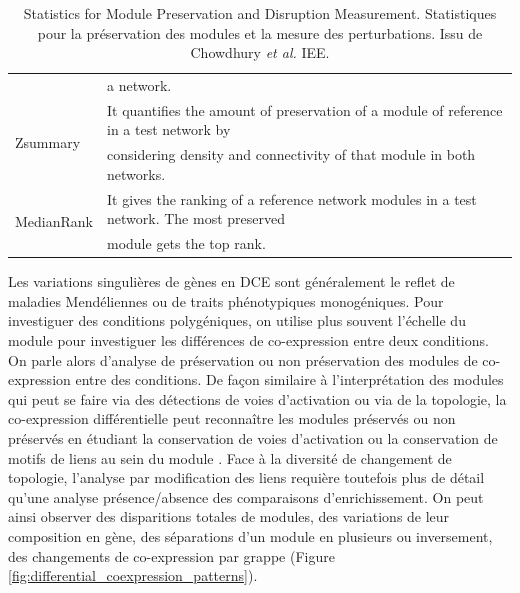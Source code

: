 \begin{table}[h!]
{\begin{tabular}{@{}ll@{}}
                                                                                            & a network.                                                                                          \\
\multirow{2}{*}{Zsummary \cite{Langfelder2011}}                                                         & It quantifies the amount of preservation of a module of reference in a test network by              \\
                                                                                            & considering density and connectivity of that module in both networks.                               \\
\multirow{2}{*}{MedianRank \cite{Langfelder2011}}                                                       & It gives the ranking of a reference network modules in a test network. The most preserved           \\
                                                                                            & module gets the top rank.                                                                           \\ \cmidrule(l){2-2} 
\end{tabular}
}
\caption[Statistiques pour la préservation des modules et la mesure des perturbations]{Statistics for Module Preservation and Disruption Measurement. Statistiques pour la préservation des modules et la mesure des perturbations. Issu de Chowdhury \textit{et al.} \cite{Chowdhury2019}  IEE. }
\label{table:chowdury_metrics_DCE}
\end{table}

Les variations singulières de gènes en DCE sont généralement le reflet de maladies Mendéliennes ou de traits phénotypiques monogéniques. Pour investiguer des conditions polygéniques, on utilise plus souvent l'échelle du module pour investiguer les différences de co-expression entre deux conditions. On parle alors d'analyse de préservation ou non préservation des modules de co-expression entre des conditions. De façon similaire à l'interprétation des modules qui peut se faire via des détections de voies d'activation ou via de la topologie, la co-expression différentielle peut reconnaître les modules préservés ou non préservés en étudiant la conservation de voies d'activation ou la conservation de motifs de liens au sein du module \cite{Chowdhury2019}. Face à la diversité de changement de topologie, l'analyse par modification des liens requière toutefois plus de détail qu'une analyse présence/absence des comparaisons d'enrichissement. On peut ainsi observer des disparitions totales de modules, des variations de leur composition en gène, des séparations d'un module en plusieurs ou inversement, des changements de co-expression par grappe (Figure \ref{fig:differential_coexpression_patterns}).

